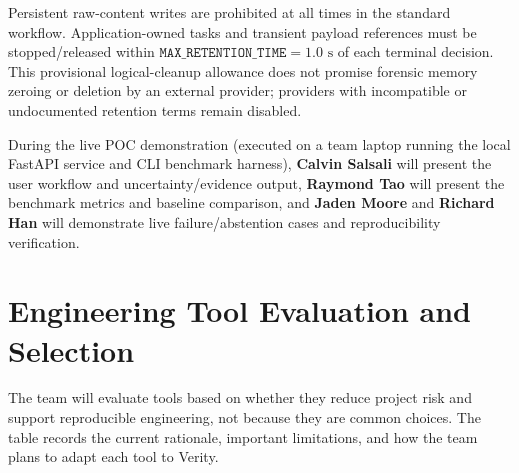 \documentclass{article}
\begin{document}
Persistent raw-content writes are prohibited at all times in the standard workflow. Application-owned tasks and transient payload references must be stopped/released within $\texttt{MAX\_RETENTION\_TIME}=1.0\text{ s}$ of each terminal decision. This provisional logical-cleanup allowance does not promise forensic memory zeroing or deletion by an external provider; providers with incompatible or undocumented retention terms remain disabled.

During the live POC demonstration (executed on a team laptop running the local FastAPI service and CLI benchmark harness), \textbf{Calvin Salsali} will present the user workflow and uncertainty/evidence output, \textbf{Raymond Tao} will present the benchmark metrics and baseline comparison, and \textbf{Jaden Moore} and \textbf{Richard Han} will demonstrate live failure/abstention cases and reproducibility verification.

\section{Engineering Tool Evaluation and Selection}

The team will evaluate tools based on whether they reduce project risk and support reproducible engineering, not because they are common choices. The table records the current rationale, important limitations, and how the team plans to adapt each tool to Verity.
\end{document}
